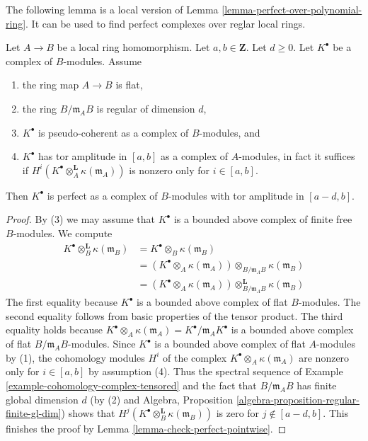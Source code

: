 \noindent
The following lemma is a local version of
Lemma \ref{lemma-perfect-over-polynomial-ring}.
It can be used to find perfect complexes over reglar local rings.

\begin{lemma}
\label{lemma-perfect-over-regular-local-ring}
Let $A \to B$ be a local ring homomorphism.
Let $a, b \in \mathbf{Z}$. Let $d \geq 0$.
Let $K^\bullet$ be a complex of $B$-modules. Assume
\begin{enumerate}
\item the ring map $A \to B$ is flat,
\item the ring $B/\mathfrak m_AB$ is regular of dimension $d$,
\item $K^\bullet$ is pseudo-coherent as a complex of $B$-modules, and
\item $K^\bullet$ has tor amplitude in $[a, b]$ as a complex
of $A$-modules, in fact it suffices if
$H^i(K^\bullet \otimes_A^\mathbf{L} \kappa(\mathfrak m_A))$
is nonzero only for $i \in [a, b]$.
\end{enumerate}
Then $K^\bullet$ is perfect as a complex of $B$-modules
with tor amplitude in $[a - d, b]$.
\end{lemma}

\begin{proof}
By (3) we may assume that $K^\bullet$ is a bounded above complex of finite free
$B$-modules. We compute
\begin{align*}
K^\bullet \otimes_B^{\mathbf{L}} \kappa(\mathfrak m_B)
& = K^\bullet \otimes_B \kappa(\mathfrak m_B) \\
& = (K^\bullet \otimes_A \kappa(\mathfrak m_A))
\otimes_{B/\mathfrak m_A B} \kappa(\mathfrak m_B) \\
& = (K^\bullet \otimes_A \kappa(\mathfrak m_A))
\otimes^{\mathbf{L}}_{B/\mathfrak m_A B} \kappa(\mathfrak m_B)
\end{align*}
The first equality because $K^\bullet$ is a bounded above complex
of flat $B$-modules. The second equality follows from basic 
properties of the tensor product. The third equality holds because
$K^\bullet \otimes_A \kappa(\mathfrak m_A) =
K^\bullet/ \mathfrak m_A K^\bullet$ is a bounded above complex
of flat $B/\mathfrak m_A B$-modules. Since $K^\bullet$ is a bounded
above complex of flat $A$-modules by (1), the cohomology modules $H^i$
of the complex $K^\bullet \otimes_A \kappa(\mathfrak m_A)$ are nonzero only
for $i \in [a, b]$ by assumption (4). Thus the spectral sequence
of Example \ref{example-cohomology-complex-tensored} and the
fact that $B/\mathfrak m_AB$ has finite global dimension $d$
(by (2) and
Algebra, Proposition \ref{algebra-proposition-regular-finite-gl-dim})
shows that $H^j(K^\bullet \otimes_B^{\mathbf{L}} \kappa(\mathfrak m_B))$
is zero for $j \not \in [a - d, b]$.
This finishes the proof by Lemma \ref{lemma-check-perfect-pointwise}.
\end{proof}

